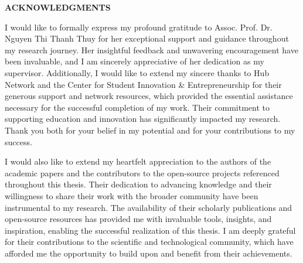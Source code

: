 \documentclass[../Main.tex]{subfiles}
\begin{document}
	\begin{center}
		\Large{\textbf{ACKNOWLEDGMENTS}}\\
	\end{center}
	\vspace{1cm}
	I would like to formally express my profound gratitude to Assoc. Prof. Dr. Nguyen Thi Thanh Thuy
	for her exceptional support and guidance throughout my research journey. Her
	insightful feedback and unwavering encouragement have been invaluable, and I am
	sincerely appreciative of her dedication as my supervisor. Additionally, I would
	like to extend my sincere thanks to Hub Network and the Center for Student Innovation & Entrepreneurship
	for their generous support and network resources, which provided the essential assistance necessary for the successful completion
	of my work. Their commitment to supporting education and innovation has significantly
	impacted my research. Thank you both for your belief in my potential and for
	your contributions to my success.

	I would also like to extend my heartfelt appreciation to the authors of the
	academic papers and the contributors to the open-source projects referenced
	throughout this thesis. Their dedication to advancing knowledge and their willingness
	to share their work with the broader community have been instrumental to my research.
	The availability of their scholarly publications and open-source resources has
	provided me with invaluable tools, insights, and inspiration, enabling the successful
	realization of this thesis. I am deeply grateful for their contributions to
	the scientific and technological community, which have afforded me the opportunity
	to build upon and benefit from their achievements.
\end{document}

